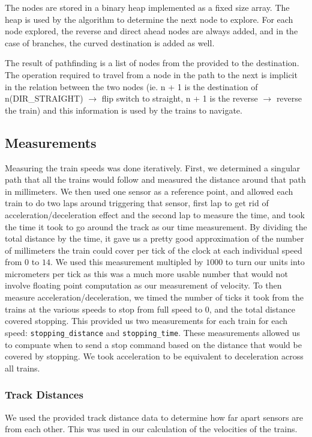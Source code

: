 \documentclass[12pt]{article}
\begin{document}
The nodes are stored in a binary heap implemented as a fixed size array. The heap is used by the algorithm to determine
the next node to explore. For each node explored, the reverse and direct ahead nodes are always added, and in the case
of branches, the curved destination is added as well.

The result of pathfinding is a list of nodes from the provided to the destination. The operation required to travel from
a node in the path to the next is implicit in the relation between the two nodes (ie. n + 1 is the destination of
n(DIR\_STRAIGHT) $\rightarrow$ flip switch to straight, n + 1 is the reverse $\rightarrow$ reverse the train) and this information is used by
the trains to navigate.
\\[1\baselineskip]
\subsection{Measurements}
Measuring the train speeds was done iteratively.  First, we determined a singular path that all the trains would follow and measured the distance around that path in millimeters.  We then used one sensor as a reference point, and allowed each train to do two laps around triggering that sensor, first lap to get rid of acceleration/deceleration effect and the second lap to measure the time, and took the time it took to go around the track as our time measurement.  By dividing the total distance by the time, it gave us a pretty good approximation of the number of millimeters the train could cover per tick of the clock at each individual speed from $0$ to $14$.  We used this measurement multipled by $1000$ to turn our units into micrometers per tick as this was a much more usable number that would not involve floating point computation as our measurement of velocity.  To then measure acceleration/deceleration, we timed the number of ticks it took from the trains at the various speeds to stop from full speed to $0$, and the total distance covered stopping.  This provided us two measurements for each train for each speed: {\tt stopping\_distance} and {\tt stopping\_time}.  These measurements allowed us to compuate when to send a stop command based on the distance that would be covered by stopping.  We took acceleration to be equivalent to deceleration across all trains.
\\
\subsubsection{Track Distances}
We used the provided track distance data to determine how far apart sensors are from each other.  This was used in our calculation of the velocities of the trains.
\\[1\baselineskip]
\end{document}
